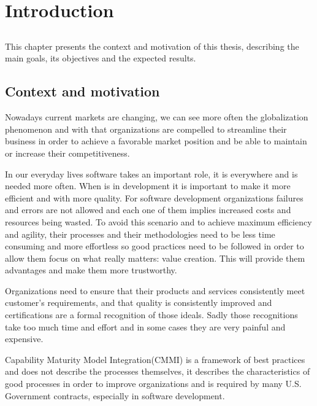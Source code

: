 \chapter{Introduction} \label{chap:intro}

\section*{}

This chapter presents the context and motivation of this thesis, describing the main goals, its objectives and the expected results.

\section{Context and motivation} \label{sec:context}

Nowadays current markets are changing, we can see more often the globalization phenomenon and with that organizations are compelled to streamline their business in order to achieve a favorable market position and be able to maintain or increase their competitiveness.

In our everyday lives software takes an important role, it is everywhere and is needed more often. When is in development it is important to make it more efficient and with more quality. For software development organizations failures and errors are not allowed and each one of them implies increased costs and resources being wasted. To avoid this scenario and to achieve maximum efficiency and agility, their processes and their methodologies need to be less time consuming and more effortless so good practices need to be followed in order to allow them focus on what really matters: value creation. This will provide them advantages and make them more trustworthy.

Organizations need to ensure that their products and services consistently meet customer’s requirements, and that quality is consistently improved and certifications are a formal recognition of those ideals. Sadly those recognitions take too much time and effort and in some cases they are very painful and expensive.

Capability Maturity Model Integration(CMMI)\citep{CMMI} is a framework of best practices and does not describe the processes themselves, it describes the characteristics of good processes in order to improve organizations and is required by many U.S. Government contracts, especially in software development.

